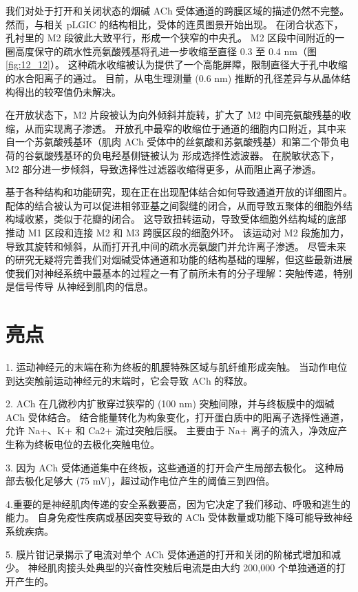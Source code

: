 我们对处于打开和关闭状态的烟碱 ACh 受体通道的跨膜区域的描述仍然不完整。 
然而，与相关 pLGIC 的结构相比，受体的连贯图景开始出现。 
在闭合状态下，孔衬里的 M2 段彼此大致平行，形成一个狭窄的中央孔。 
M2 区段中间附近的一圈高度保守的疏水性亮氨酸残基将孔进一步收缩至直径 0.3 至 0.4 nm（图 \ref{fig:12_12}）。 
这种疏水收缩被认为提供了一个高能屏障，限制直径大于孔中收缩的水合阳离子的通过。 
目前，从电生理测量 (0.6 nm) 推断的孔径差异与从晶体结构得出的较窄值仍未解决。


在开放状态下，M2 片段被认为向外倾斜并旋转，扩大了 M2 中间亮氨酸残基的收缩，从而实现离子渗透。 
开放孔中最窄的收缩位于通道的细胞内口附近，其中来自一个苏氨酸残基环（肌肉 ACh 受体中的丝氨酸和苏氨酸残基）和第二个带负电荷的谷氨酸残基环的负电羟基侧链被认为 形成选择性滤波器。 
在脱敏状态下，M2 部分进一步倾斜，导致选择性过滤器收缩得更多，从而阻止离子渗透。


基于各种结构和功能研究，现在正在出现配体结合如何导致通道开放的详细图片。 
配体的结合被认为可以促进相邻亚基之间裂缝的闭合，从而导致五聚体的细胞外结构域收紧，类似于花瓣的闭合。 
这导致扭转运动，导致受体细胞外结构域的底部推动 M1 区段和连接 M2 和 M3 跨膜区段的细胞外环。 
该运动对 M2 段施加力，导致其旋转和倾斜，从而打开孔中间的疏水亮氨酸门并允许离子渗透。 
尽管未来的研究无疑将完善我们对烟碱受体通道和功能的结构基础的理解，但这些最新进展使我们对神经系统中最基本的过程之一有了前所未有的分子理解：突触传递，特别是信号传导 从神经到肌肉的信息。



\section{亮点}

1. 运动神经元的末端在称为终板的肌膜特殊区域与肌纤维形成突触。 
当动作电位到达突触前运动神经元的末端时，它会导致 ACh 的释放。 


2. ACh 在几微秒内扩散穿过狭窄的 (100 nm) 突触间隙，并与终板膜中的烟碱 ACh 受体结合。 
结合能量转化为构象变化，打开蛋白质中的阳离子选择性通道，允许 Na+、K+ 和 Ca2+ 流过突触后膜。 
主要由于 Na+ 离子的流入，净效应产生称为终板电位的去极化突触电位。 


3. 因为 ACh 受体通道集中在终板，这些通道的打开会产生局部去极化。 
这种局部去极化足够大 (75 mV)，超过动作电位产生的阈值三到四倍。 


4.重要的是神经肌肉传递的安全系数要高，因为它决定了我们移动、呼吸和逃生的能力。 
自身免疫性疾病或基因突变导致的 ACh 受体数量或功能下降可能导致神经系统疾病。 


5. 膜片钳记录揭示了电流对单个 ACh 受体通道的打开和关闭的阶梯式增加和减少。 
神经肌肉接头处典型的兴奋性突触后电流是由大约 200,000 个单独通道的打开产生的。 


